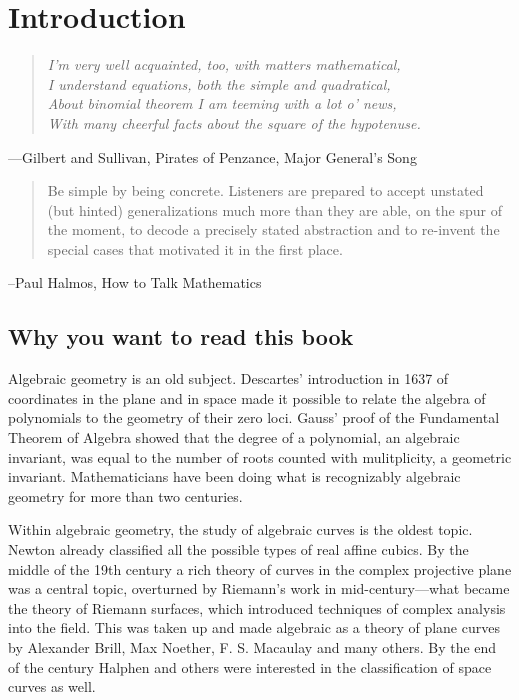 

\setlength{\parskip}{5pt}

\addtocounter{chapter}{-1}
\chapter{Introduction}
\label{IntroChapter}

\begin{quote}\it{I'm very well acquainted, too, with matters mathematical,\\
I understand equations, both the simple and quadratical,\\
About binomial theorem I am teeming with a lot o' news,\\
With many cheerful facts about the square of the hypotenuse.}
\end{quote}

---Gilbert and Sullivan, Pirates of Penzance, Major General's Song


\begin{quote}
Be simple by being concrete. Listeners are prepared to
accept unstated (but hinted) generalizations much more than they are able, on the spur of the moment, to
decode a precisely stated abstraction and to re-invent the special cases that motivated it in the first place. 
\end{quote}

--Paul Halmos, How to Talk Mathematics
\section{Why you want to read this book}

Algebraic geometry is an old subject. Descartes' introduction in 1637 of coordinates in the plane and in space made it possible to relate the algebra of polynomials to the geometry of their zero loci. Gauss' proof of the Fundamental Theorem of Algebra showed that the degree of a polynomial, an algebraic invariant, was equal to the number of roots counted with mulitplicity, a geometric invariant. Mathematicians have been doing what is recognizably algebraic geometry for more than two centuries.

Within algebraic geometry, the study of algebraic curves is the oldest topic. Newton already classified all the possible types of real affine cubics. By the middle of
the 19th century a rich theory of curves in the complex projective plane was a central topic, overturned by Riemann's work in mid-century---what became the theory of Riemann surfaces, which introduced techniques of complex analysis into the field. This was  taken up and made algebraic as a theory of plane curves by Alexander Brill, Max Noether, F. S. Macaulay and many others. By the end of the century Halphen and others were interested in the classification of space curves as well. 

